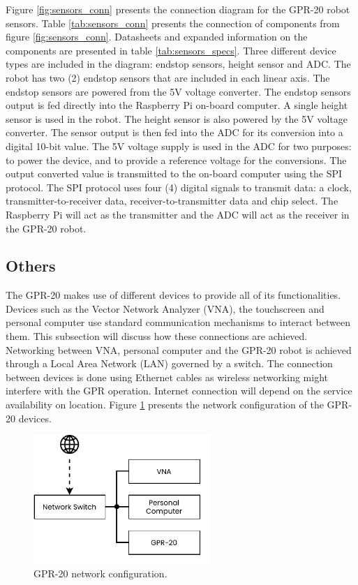 \documentclass{article}
\begin{document}
\clearpage

Figure \ref{fig:sensors_conn} presents the connection diagram for the GPR-20 robot sensors. Table \ref{tab:sensors_conn} presents the connection of components from figure \ref{fig:sensors_conn}. Datasheets and expanded information on the components are presented in table \ref{tab:sensors_specs}. Three different device types are included in the diagram: endstop sensors, height sensor and ADC. The robot has two (2) endstop sensors that are included in each linear axis. The endstop sensors are powered from the 5V voltage converter. The endstop sensors output is fed directly into the Raspberry Pi on-board computer. A single height sensor is used in the robot. The height sensor is also powered by the 5V voltage converter. The sensor output is then fed into the ADC for its conversion into a digital 10-bit value. The 5V voltage supply is used in the ADC for two purposes: to power the device, and to provide a reference voltage for the conversions. The output converted value is transmitted to the on-board computer using the SPI protocol. The SPI protocol uses four (4) digital signals to transmit data: a clock, transmitter-to-receiver data, receiver-to-transmitter data and chip select. The Raspberry Pi will act as the transmitter and the ADC will act as the receiver in the GPR-20 robot.

\subsection{Others}
The GPR-20 makes use of different devices to provide all of its functionalities. Devices such as the Vector Network Analyzer (VNA), the touchscreen and personal computer use standard communication mechanisms to interact between them. This subsection will discuss how these connections are achieved. Networking between VNA, personal computer and the GPR-20 robot is achieved through a Local Area Network (LAN) governed by a switch. The connection between devices is done using Ethernet cables as wireless networking might interfere with the GPR operation. Internet connection will depend on the service availability on location. Figure \ref{fig:gpr20_network} presents the network configuration of the GPR-20 devices. 

\begin{figure}[h]
    \centering
    \includegraphics[width=0.6\textwidth]{images/electronics/others/GPR20_networking.pdf}
    \caption{GPR-20 network configuration.}
    \label{fig:gpr20_network}
\end{figure}
\end{document}
